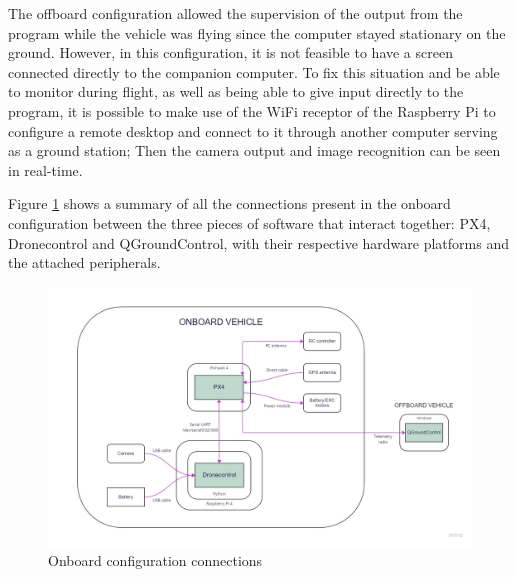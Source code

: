 The offboard configuration allowed the supervision of the output from the program while the vehicle was flying since the computer stayed stationary on the ground. 
However, in this configuration, it is not feasible to have a screen connected directly to the companion computer.
To fix this situation and be able to monitor during flight, as well as being able to give input directly to the program, it is possible to make use of the WiFi receptor of the Raspberry Pi to configure a remote desktop and connect to it through another computer serving as a ground station;
Then the camera output and image recognition can be seen in real-time.

Figure \ref{fig:onboard-config} shows a summary of all the connections present in the onboard configuration between the three pieces of software that interact together: PX4, Dronecontrol and QGroundControl, with their respective hardware platforms and the attached peripherals.

\begin{figure}
  \centering
  \includegraphics[width=\textwidth,keepaspectratio]{img/onboard-diagram.jpg}
  \caption{Onboard configuration connections}
  \label{fig:onboard-config}
\end{figure}
